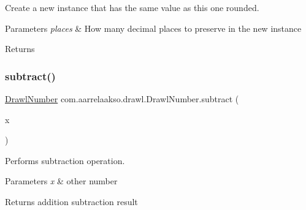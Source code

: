 Create a new instance that has the same value as this one rounded. 


\begin{DoxyParams}{Parameters}
{\em places} & How many decimal places to preserve in the new instance \\
\hline
\end{DoxyParams}
\begin{DoxyReturn}{Returns}

\end{DoxyReturn}
\mbox{\label{classcom_1_1aarrelaakso_1_1drawl_1_1_drawl_number_af22316798b9d93dc113c6e6769c6ec7f}} 
\subsubsection{\texorpdfstring{subtract()}{subtract()}\hspace{0.1cm}{\footnotesize\ttfamily [1/3]}}
{\footnotesize\ttfamily \hyperlink{classcom_1_1aarrelaakso_1_1drawl_1_1_drawl_number}{Drawl\+Number} com.\+aarrelaakso.\+drawl.\+Drawl\+Number.\+subtract (\begin{DoxyParamCaption}\item[{\hyperlink{classcom_1_1aarrelaakso_1_1drawl_1_1_drawl_number}{Drawl\+Number}}]{x }\end{DoxyParamCaption})\hspace{0.3cm}{\ttfamily [protected]}}



Performs subtraction operation. 


\begin{DoxyParams}{Parameters}
{\em x} & other number \\
\hline
\end{DoxyParams}
\begin{DoxyReturn}{Returns}
addition subtraction result 
\end{DoxyReturn}
\mbox{\label{classcom_1_1aarrelaakso_1_1drawl_1_1_drawl_number_a178417df4cbe7a65403cb33a1c0da1e3}} 
